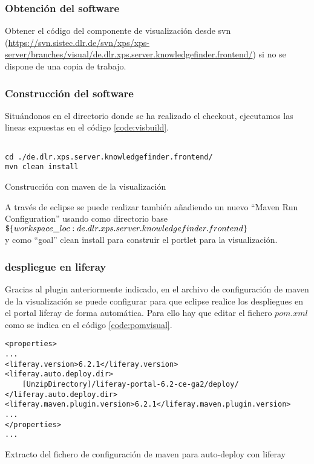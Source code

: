 \subsubsection{Obtención del \gls{software}}
Obtener el código del componente de visualización desde \gls{svn} (\url{https://svn.sistec.dlr.de/svn/xps/xps-server/branches/visual/de.dlr.xps.server.knowledgefinder.frontend/}) si no se dispone de una copia de trabajo.

\subsubsection{Construcción del \gls{software}}
Situándonos en el directorio donde se ha realizado el checkout, ejecutamos las lineas expuestas en el código \ref{code:visbuild}.


\begin{listing}[H]
    \begin{verbatim}

cd ./de.dlr.xps.server.knowledgefinder.frontend/
mvn clean install
    \end{verbatim}
    \caption{Construcción con \gls{maven} de la visualización}
    \label{code:visbuild}
\end{listing}

A través de \gls{eclipse} se puede realizar también añadiendo un nuevo ``Maven Run Configuration'' usando como directorio base\\ 
$\$\{workspace\_loc:\/de.dlr.xps.server.knowledgefinder.frontend\}$\\
y como ``goal'' clean install para construir el \gls{portlet} para la visualización.

\subsubsection{\Gls{despliegue} en \gls{liferay}}
Gracias al \gls{plugin} anteriormente indicado, en el archivo de configuración de \gls{maven} de la visualización se puede configurar para que \gls{eclipse} realice los \glspl{despliegue}
 en el portal \gls{liferay} de forma automática. Para ello hay que editar el fichero $pom.xml$ como se indica en el código \ref{code:pomvisual}.

\begin{listing}[H]
    \begin{verbatim}
<properties>
...
<liferay.version>6.2.1</liferay.version>
<liferay.auto.deploy.dir>
	[UnzipDirectory]/liferay-portal-6.2-ce-ga2/deploy/
</liferay.auto.deploy.dir>
<liferay.maven.plugin.version>6.2.1</liferay.maven.plugin.version>
...
</properties>
...
    \end{verbatim}
    \caption{Extracto del fichero de configuración de \gls{maven} para auto-\gls{deploy} con \gls{liferay}}
    \label{code:pomvisual}
\end{listing}


